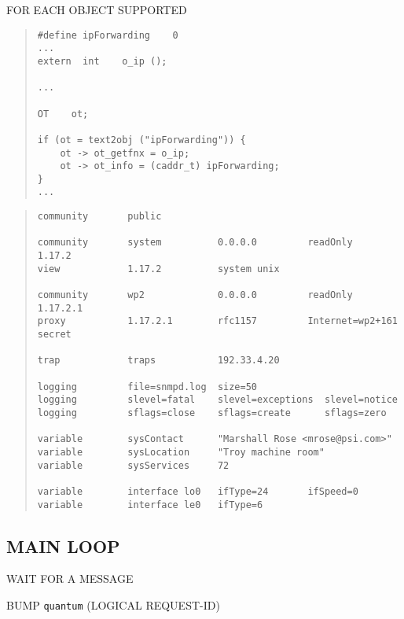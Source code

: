 \begin{bwslide}

\begin{nrtc}
\item	FOR EACH OBJECT SUPPORTED
\begin{quote}\small\begin{verbatim}
#define ipForwarding    0
...
extern  int    o_ip ();

...

OT    ot;

if (ot = text2obj ("ipForwarding")) {
    ot -> ot_getfnx = o_ip;
    ot -> ot_info = (caddr_t) ipForwarding;
}
...
\end{verbatim}\end{quote}
\end{nrtc}
\end{bwslide}


\begin{bwslide}

\begin{quote}\small\begin{verbatim}
community       public

community       system          0.0.0.0         readOnly            1.17.2
view            1.17.2          system unix

community       wp2             0.0.0.0         readOnly            1.17.2.1
proxy           1.17.2.1        rfc1157         Internet=wp2+161    secret

trap            traps           192.33.4.20

logging         file=snmpd.log  size=50
logging         slevel=fatal    slevel=exceptions  slevel=notice
logging         sflags=close    sflags=create      sflags=zero

variable        sysContact      "Marshall Rose <mrose@psi.com>"
variable        sysLocation     "Troy machine room"
variable        sysServices     72

variable        interface lo0   ifType=24       ifSpeed=0
variable        interface le0   ifType=6
\end{verbatim}\end{quote}
\end{bwslide}


\begin{bwslide}
\part*	{MAIN LOOP}\bf

\begin{nrtc}
\item	WAIT FOR A MESSAGE

\item	BUMP \verb"quantum" (LOGICAL REQUEST-ID)
\end{nrtc}
\end{bwslide}


